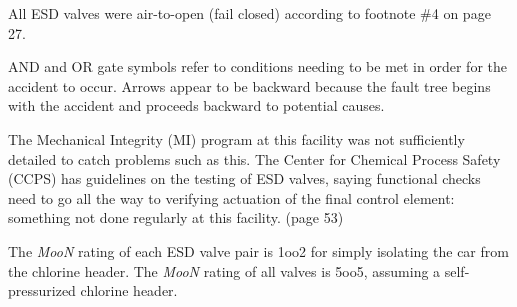 All ESD valves were air-to-open (fail closed) according to footnote \#4 on page 27.

\vskip 10pt

AND and OR gate symbols refer to conditions needing to be met in order for the accident to occur.  Arrows appear to be backward because the fault tree begins with the accident and proceeds backward to potential causes.

\vskip 10pt

The Mechanical Integrity (MI) program at this facility was not sufficiently detailed to catch problems such as this.  The Center for Chemical Process Safety (CCPS) has guidelines on the testing of ESD valves, saying functional checks need to go all the way to verifying actuation of the final control element: something not done regularly at this facility.  (page 53)

\vskip 10pt

The {\it MooN} rating of each ESD valve pair is 1oo2 for simply isolating the car from the chlorine header.  The {\it MooN} rating of all valves is 5oo5, assuming a self-pressurized chlorine header.




